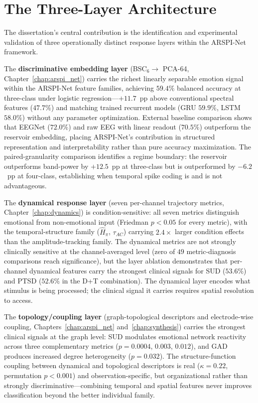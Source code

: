 \section{The Three-Layer Architecture}

The dissertation's central contribution is the identification and experimental validation of three operationally distinct response layers within the ARSPI-Net framework.

The \textbf{discriminative embedding layer} (BSC$_6 \to$ PCA-64, Chapter~\ref{chap:arspi_net}) carries the richest linearly separable emotion signal within the ARSPI-Net feature families, achieving $59.4\%$ balanced accuracy at three-class under logistic regression---$+11.7$~pp above conventional spectral features ($47.7\%$) and matching trained recurrent models (GRU $59.9\%$, LSTM $58.0\%$) without any parameter optimization. External baseline comparison shows that EEGNet ($72.0\%$) and raw EEG with linear readout ($70.5\%$) outperform the reservoir embedding, placing ARSPI-Net's contribution in structured representation and interpretability rather than pure accuracy maximization. The paired-granularity comparison identifies a regime boundary: the reservoir outperforms band-power by $+12.5$~pp at three-class but is outperformed by $-6.2$~pp at four-class, establishing when temporal spike coding is and is not advantageous.

The \textbf{dynamical response layer} (seven per-channel trajectory metrics, Chapter~\ref{chap:dynamics}) is condition-sensitive: all seven metrics distinguish emotional from non-emotional input (Friedman $p < 0.05$ for every metric), with the temporal-structure family ($\hat{H}_\pi$, $\tau_{AC}$) carrying $2.4\times$ larger condition effects than the amplitude-tracking family. The dynamical metrics are not strongly clinically sensitive at the channel-averaged level (zero of $49$ metric-diagnosis comparisons reach significance), but the layer ablation demonstrates that per-channel dynamical features carry the strongest clinical signals for SUD ($53.6\%$) and PTSD ($52.6\%$ in the D+T combination). The dynamical layer encodes what stimulus is being processed; the clinical signal it carries requires spatial resolution to access.

The \textbf{topology/coupling layer} (graph-topological descriptors and electrode-wise coupling, Chapters~\ref{chap:arspi_net} and~\ref{chap:synthesis}) carries the strongest clinical signals at the graph level: SUD modulates emotional network reactivity across three complementary metrics ($p = 0.0004$, $0.003$, $0.012$), and GAD produces increased degree heterogeneity ($p = 0.032$). The structure-function coupling between dynamical and topological descriptors is real ($\kappa = 0.22$, permutation $p < 0.001$) and observation-specific, but organizational rather than strongly discriminative---combining temporal and spatial features never improves classification beyond the better individual family.


